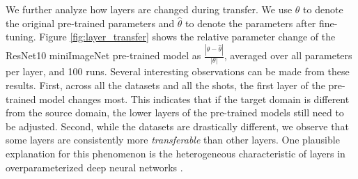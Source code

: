 \documentclass[runningheads]{llncs}
\begin{document}
We further analyze how layers are changed during transfer. We use $\theta$ to denote the original pre-trained parameters and $\hat{\theta}$ to denote the parameters after fine-tuning. Figure \ref{fig:layer_transfer} shows the relative parameter change of the ResNet10 miniImageNet pre-trained model as $\frac{|\theta -\hat{\theta}|}{|\theta|}$, averaged over all parameters per layer, and 100 runs. Several interesting observations can be made from these results. First, across all the datasets and all the shots, the first layer of the pre-trained model changes most. This indicates that if the target domain is different from the source domain, the lower layers of the pre-trained models still need to be adjusted. Second, while the datasets are drastically different, we observe that some layers are consistently more \textit{transferable} than other layers. One plausible explanation for this phenomenon is the heterogeneous characteristic of layers in overparameterized deep neural networks \cite{zhang2019all}.
\end{document}

